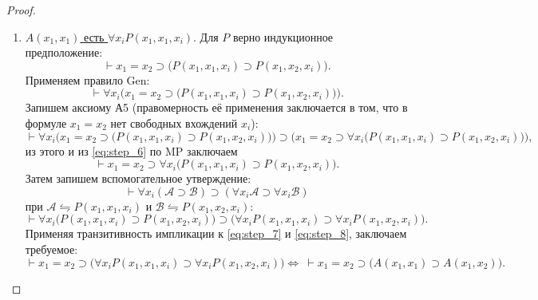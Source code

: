 \begin{proof}
\begin{enumerate}
        \item \underline{$A(x_1, x_1)$ есть $\forall x_iP(x_1, x_1, x_i)$}. Для $P$ верно индукционное предположение:
        \[
            \vdash x_1 = x_2 \supset \big(P(x_1, x_1, x_i) \supset P(x_1, x_2, x_i)\big).
        \]
        Применяем правило Gen:
        \begin{equation}\label{eq:step_6}
            \vdash \forall x_i\Big(x_1 = x_2 \supset \big(P(x_1, x_1, x_i) \supset P(x_1, x_2, x_i)\big)\Big).
        \end{equation}
        Запишем аксиому А5 (правомерность её применения заключается в том, что в формуле $x_1 = x_2$ нет свободных вхождений $x_i$):
        \[
            \vdash \forall x_i\Big(x_1 = x_2 \supset \big(P(x_1, x_1, x_i) \supset P(x_1, x_2, x_i)\big)\Big) \supset \Big(x_1 = x_2 \supset \forall x_i\big(P(x_1, x_1, x_i) \supset P(x_1, x_2, x_i)\big)\Big),
        \]
        из этого и из \eqref{eq:step_6} по MP заключаем
        \begin{equation}\label{eq:step_7}
            \vdash x_1 = x_2 \supset \forall x_i\big(P(x_1, x_1, x_i) \supset P(x_1, x_2, x_i)\big).
        \end{equation}
        Затем запишем вспомогательное утверждение:
        \[
            \vdash \forall x_i(\mathcal{A} \supset \mathcal{B}) \supset (\forall x_i\mathcal{A} \supset \forall x_i\mathcal{B})
        \]
        при $\mathcal{A} \leftrightharpoons P(x_1, x_1, x_i)$ и $\mathcal{B} \leftrightharpoons P(x_1, x_2, x_i)$:
        \begin{equation}\label{eq:step_8}
            \vdash \forall x_i\big(P(x_1, x_1, x_i) \supset P(x_1, x_2, x_i)\big) \supset \big(\forall x_iP(x_1, x_1, x_i) \supset \forall x_iP(x_1, x_2, x_i)\big).
        \end{equation}
        Применяя транзитивность импликации к \eqref{eq:step_7} и \eqref{eq:step_8}, заключаем требуемое:
        \[
            \vdash x_1 = x_2 \supset \big(\forall x_iP(x_1, x_1, x_i) \supset \forall x_iP(x_1, x_2, x_i)\big) \Longleftrightarrow\ \vdash x_1 = x_2 \supset \big(A(x_1, x_1) \supset A(x_1, x_2)\big).
        \]
    \end{enumerate}
\end{proof}